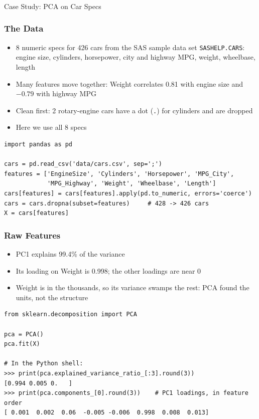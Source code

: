\begin{frame}[fragile]\frametitle{}
\begin{center}
{\Large Case Study: PCA on Car Specs}
\end{center}
\end{frame}

\begin{frame}[fragile]\frametitle{The Data}
\begin{itemize}
\item 8 numeric specs for 426 cars from the SAS sample data set \texttt{SASHELP.CARS}: engine size, cylinders, horsepower, city and highway MPG, weight, wheelbase, length
\item Many features move together: Weight correlates 0.81 with engine size and $-0.79$ with highway MPG
\item Clean first: 2 rotary-engine cars have a dot (\texttt{.}) for cylinders and are dropped
\item Here we use all 8 specs
\end{itemize}
\begin{lstlisting}
import pandas as pd

cars = pd.read_csv('data/cars.csv', sep=';')
features = ['EngineSize', 'Cylinders', 'Horsepower', 'MPG_City',
            'MPG_Highway', 'Weight', 'Wheelbase', 'Length']
cars[features] = cars[features].apply(pd.to_numeric, errors='coerce')
cars = cars.dropna(subset=features)     # 428 -> 426 cars
X = cars[features]
\end{lstlisting}
\end{frame}

\begin{frame}[fragile]\frametitle{Raw Features}
\begin{itemize}
\item PC1 explains 99.4\% of the variance
\item Its loading on Weight is 0.998; the other loadings are near 0
\item Weight is in the thousands, so its variance swamps the rest: PCA found the units, not the structure
\end{itemize}
\begin{lstlisting}
from sklearn.decomposition import PCA

pca = PCA()
pca.fit(X)

# In the Python shell:
>>> print(pca.explained_variance_ratio_[:3].round(3))
[0.994 0.005 0.   ]
>>> print(pca.components_[0].round(3))    # PC1 loadings, in feature order
[ 0.001  0.002  0.06  -0.005 -0.006  0.998  0.008  0.013]
\end{lstlisting}
\end{frame}


